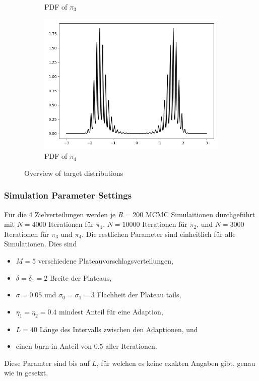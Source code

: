 \documentclass{scrartcl}
\begin{document}
\begin{figure}
\begin{subfigure}{.45\textwidth}
              \caption{PDF of $\pi_3$}
              \label{target_distributions_pi_3}
        \end{subfigure}
        \begin{subfigure}{.45\textwidth}
              \centering
              \includegraphics[width=.8\linewidth]{../figs/fig_3_pi_4.png}
              \caption{PDF of $\pi_4$}
              \label{target_distributions_pi_4}
        \end{subfigure}
        \caption{Overview of target distributions}
        \label{target_distributions}
    \end{figure}

    \subsubsection{Simulation Parameter Settings}
    Für die 4 Zielverteilungen werden je $R=200$ MCMC Simulaitionen durchgeführt mit $N=4000$ Iterationen für $\pi_1$, $N=10000$ Iterationen für $\pi_2$, und $N=3000$ Iterationen für $\pi_3$ und $\pi_4$.
    Die restlichen Parameter sind einheitlich für alle Simulationen. Dies sind
    \begin{itemize}
        \item $M=5$ verschiedene Plateauvorschlagsverteilungen,
        \item $\delta=\delta_1=2$ Breite der Plateaus,
        \item $\sigma=0.05$ und $\sigma_0=\sigma_1=3$ Flachheit der Plateau tails,
        \item $\eta_1=\eta_2=0.4$ mindest Anteil für eine Adaption,
        \item $L=40$ Länge des Intervalls zwischen den Adaptionen, und
        \item einen burn-in Anteil von $0.5$ aller Iterationen.
    \end{itemize}
    Diese Paramter sind bis auf $L$, für welchen es keine exakten Angaben gibt, genau wie in \cite{lau2019} gesetzt.
\end{document}
